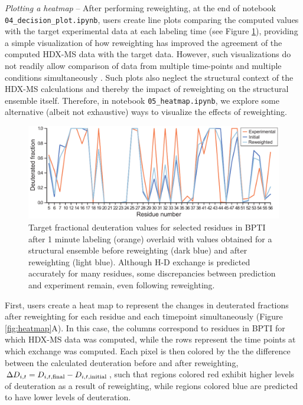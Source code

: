 \documentclass[9pt,tutorial,ASAPversion]{livecoms}
\begin{document}
\noindent
\textit{Plotting a heatmap} -- After performing reweighting, at the end of notebook \texttt{04\_decision\_plot.ipynb}, users create line plots comparing the computed values with the target experimental data at each labeling time (see Figure \ref{fig:lineplot}), providing a simple visualization of how reweighting has improved the agreement of the computed HDX-MS data with the target data.
However, such visualizations do not readily allow comparison of data from multiple time-points and multiple conditions simultaneously \cite{Masson2019}. 
Such plots also neglect the structural context of the HDX-MS calculations and thereby the impact of reweighting on the structural ensemble itself.
Therefore, in notebook \texttt{05\_heatmap.ipynb}, we explore some alternative (albeit not exhaustive) ways to visualize the effects of reweighting.

\begin{figure}[ht]
    \centering
    \includegraphics[width=0.9\linewidth]{Fig5_BPTI_lineplot_1min_v4.pdf}
    \caption{Target fractional deuteration values for selected residues in BPTI after 1 minute labeling (orange) overlaid with values obtained for a structural ensemble before reweighting (dark blue) and after reweighting (light blue). Although H-D exchange is predicted accurately for many residues, some discrepancies between prediction and experiment remain, even following reweighting.}
    \label{fig:lineplot}
\end{figure}

First, users create a heat map to represent the changes in deuterated fractions after reweighting for each residue and each timepoint simultaneously (Figure \ref{fig:heatmap}A).
In this case, the columns correspond to residues in BPTI for which HDX-MS data was computed, while the rows represent the time points at which exchange was computed.
Each pixel is then colored by the the difference between the calculated deuteration before and after reweighting, $\Delta{D_{i,t}} = D_{i,t,\textnormal{final}} - D_{i,t,\textnormal{initial}}$, such that regions colored red exhibit higher levels of deuteration as a result of reweighting, while regions colored blue are predicted to have lower levels of deuteration.
\end{document}
